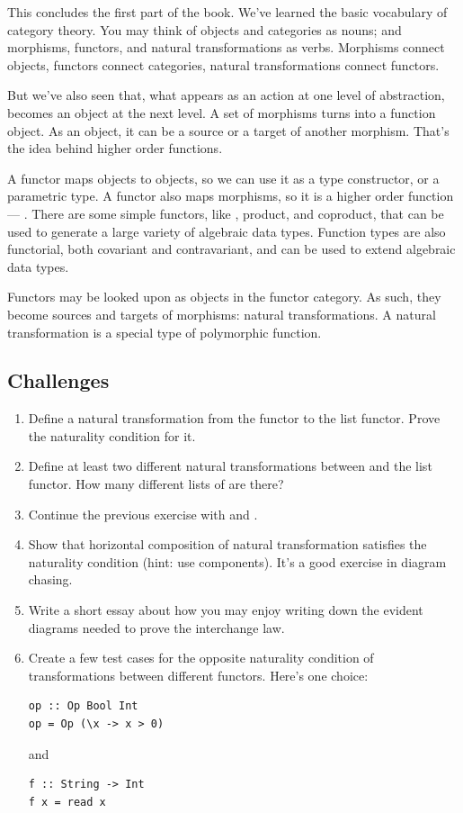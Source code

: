 This concludes the first part of the book. We've learned the basic
vocabulary of category theory. You may think of objects and categories
as nouns; and morphisms, functors, and natural transformations as verbs.
Morphisms connect objects, functors connect categories, natural
transformations connect functors.

But we've also seen that, what appears as an action at one level of
abstraction, becomes an object at the next level. A set of morphisms
turns into a function object. As an object, it can be a source or a
target of another morphism. That's the idea behind higher order
functions.

A functor maps objects to objects, so we can use it as a type
constructor, or a parametric type. A functor also maps morphisms, so it
is a higher order function --- . There are some simple
functors, like , product, and coproduct, that can be used
to generate a large variety of algebraic data types. Function types are
also functorial, both covariant and contravariant, and can be used to
extend algebraic data types.

Functors may be looked upon as objects in the functor category. As such,
they become sources and targets of morphisms: natural transformations. A
natural transformation is a special type of polymorphic function.

\subsection{Challenges}\label{challenges}

\begin{enumerate}
\item
  Define a natural transformation from the  functor to the
  list functor. Prove the naturality condition for it.
\item
  Define at least two different natural transformations between
   and the list functor. How many different lists of
  \code{()} are there?
\item
  Continue the previous exercise with  and
  .
\item
  Show that horizontal composition of natural transformation satisfies
  the naturality condition (hint: use components). It's a good exercise
  in diagram chasing.
\item
  Write a short essay about how you may enjoy writing down the evident
  diagrams needed to prove the interchange law.
\item
  Create a few test cases for the opposite naturality condition of
  transformations between different  functors. Here's one
  choice:

\begin{verbatim}
op :: Op Bool Int
op = Op (\x -> x > 0)
\end{verbatim}

  and

\begin{verbatim}
f :: String -> Int
f x = read x
\end{verbatim}
\end{enumerate}


